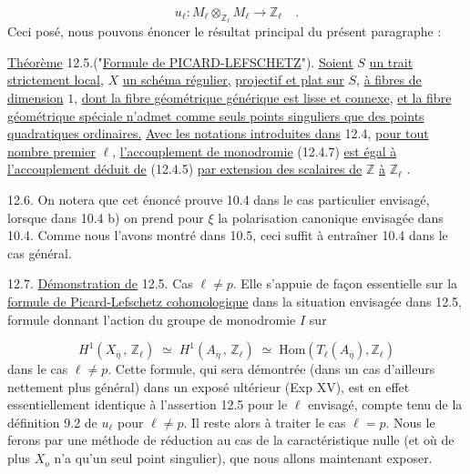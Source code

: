 \begin{equation}\tag{12.4.7}
u_{\ell} : M_{\ell} \otimes_{\mathbb{Z}_{\ell}} M_{\ell} \longrightarrow \mathbb{Z}_{\ell} \quad .
\end{equation}
Ceci posé, nous pouvons énoncer le résultat principal du présent paragraphe :

\underline{Théorème} 12.5.("\underline{Formule de PICARD-LEFSCHETZ}"). \underline{Soient} $S$ \underline{un trait strictement local,} $X$ \underline{un schéma régulier,} \underline{projectif et plat sur} $S$, \underline{à fibres de dimension} $1$, \underline{dont la fibre géométrique générique est lisse et connexe}, \underline{et la fibre géométrique spéciale n'admet comme seuls points singuliers que des points quadratiques ordinaires.} \underline{Avec les notations introduites dans} 12.4, \underline{pour tout nombre premier} $\ell$, \underline{l'accouplement de monodromie} (12.4.7) \underline{est égal à l'accouplement déduit de} (12.4.5) \underline{par extension des scalaires de} $\mathbb{Z}$ \underline{à} $\mathbb{Z}_{\ell}$ .



12.6.  On notera que cet énoncé prouve 10.4 dans le cas particulier envisagé, lorsque dans 10.4 b) on prend pour $\xi$ la polarisation canonique envisagée dans 10.4. Comme nous l'avons montré dans 10.5, ceci suffit à entraîner 10.4 dans le cas général.

12.7.  \underline{Démonstration de} 12.5. Cas $\ell \neq p$. Elle s'appuie de façon essentielle sur la \underline{formule de Picard-Lefschetz cohomologique} dans la situation envisagée dans 12.5, formule donnant l'action du groupe de monodromie $I$ sur

\begin{equation}\tag{12.7.1}
H^1(X_{\overline{\eta}} \, , \, \mathbb{Z}_\ell) \;\simeq\; H^1(A_{\overline{\eta}} \, , \, \mathbb{Z}_\ell) \;\simeq\; \mathrm{Hom}(T_\ell(A_{\overline{\eta}}), \mathbb{Z}_\ell)
\end{equation}
dans le cas $\ell \neq p$. Cette formule, qui sera démontrée (dans un cas d'ailleurs nettement plus général) dans un exposé ultérieur (Exp XV), est en effet essentiellement identique à l'assertion 12.5 pour le $\ell$ envisagé, compte tenu de la définition 9.2 de $u_\ell$ pour $\ell \neq p$. Il reste alors à traiter le cas $\ell = p$. Nous le ferons par une méthode de réduction au cas de la caractéristique nulle (et où de plus $X_o$ n'a qu'un seul point singulier), que nous allons maintenant exposer.

